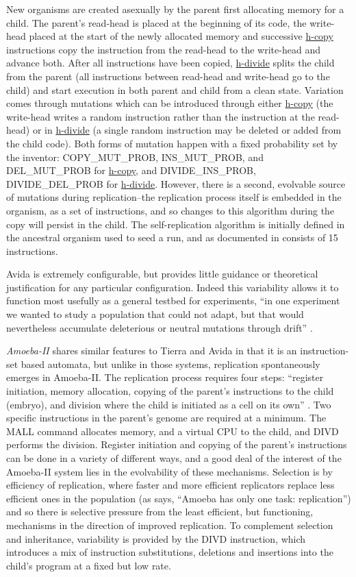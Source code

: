 New organisms are created asexually by the parent first allocating memory for a child. The parent's read-head is placed at the beginning of its code, the write-head placed at the start of the newly allocated memory and successive \url{h-copy} instructions copy the instruction from the read-head to the write-head and advance both. After all instructions have been copied, \url{h-divide} splits the child from the parent (all instructions between read-head and write-head go to the child) and start execution in both parent and child from a clean state. Variation comes through mutations which can be introduced through either \url{h-copy} (the write-head writes a random instruction rather than the instruction at the read-head) or in \url{h-divide} (a single random instruction may be deleted or added from the child code). Both forms of mutation happen with a fixed probability set by the inventor: COPY\_MUT\_PROB, INS\_MUT\_PROB, and DEL\_MUT\_PROB for \url{h-copy}, and DIVIDE\_INS\_PROB, DIVIDE\_DEL\_PROB for \url{h-divide}. However, there is a second, evolvable source of mutations during replication--the replication process itself is embedded in the organism, as a set of instructions, and so changes to this algorithm during the copy will persist in the child. The self-replication algorithm is initially defined in the ancestral organism used to seed a run, and as documented in \textcite[A1.3]{Ofria2004} consists of 15 instructions.

Avida is extremely configurable, but provides little guidance or theoretical justification for any particular configuration. Indeed this variability allows it to function most usefully as a general testbed for experiments, \eg ``in one experiment we wanted to study a population that could not adapt, but that would nevertheless accumulate deleterious or neutral mutations through drift'' \parencite{Ofria2004}.

\emph{Amoeba-II} \parencite{Pargellis2001} shares similar features to Tierra and Avida in that it is an instruction-set based automata, but unlike in those systems, replication spontaneously emerges in Amoeba-II. The replication process requires four steps: ``register initiation, memory allocation, copying of the parent's instructions to the child (embryo), and division where the child is initiated as a cell on its own'' \parencite[p.69]{Pargellis2001}. Two specific instructions in the parent's genome are required at a minimum. The MALL command allocates memory, and a virtual CPU to the child, and DIVD performs the division. Register initiation and copying of the parent's instructions can be done in a variety of different ways, and a good deal of the interest of the Amoeba-II system lies in the evolvability of these mechanisms. Selection is by efficiency of replication, where faster and more efficient replicators replace less efficient ones in the population (as \textcite{Pargellis2001} says, ``Amoeba has only one task: replication'') and so there is selective pressure from the least efficient, but functioning, mechanisms in the direction of improved replication. To complement selection and inheritance, variability is provided by the DIVD instruction, which introduces a mix of instruction substitutions, deletions and insertions into the child's program at a fixed but low rate.

